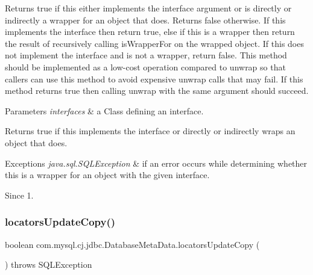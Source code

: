 Returns true if this either implements the interface argument or is directly or indirectly a wrapper for an object that does. Returns false otherwise. If this implements the interface then return true, else if this is a wrapper then return the result of recursively calling {\ttfamily is\+Wrapper\+For} on the wrapped object. If this does not implement the interface and is not a wrapper, return false. This method should be implemented as a low-\/cost operation compared to {\ttfamily unwrap} so that callers can use this method to avoid expensive {\ttfamily unwrap} calls that may fail. If this method returns true then calling {\ttfamily unwrap} with the same argument should succeed.


\begin{DoxyParams}{Parameters}
{\em interfaces} & a Class defining an interface. \\
\hline
\end{DoxyParams}
\begin{DoxyReturn}{Returns}
true if this implements the interface or directly or indirectly wraps an object that does. 
\end{DoxyReturn}

\begin{DoxyExceptions}{Exceptions}
{\em java.\+sql.\+S\+Q\+L\+Exception} & if an error occurs while determining whether this is a wrapper for an object with the given interface. \\
\hline
\end{DoxyExceptions}
\begin{DoxySince}{Since}
1. 
\end{DoxySince}
\mbox{\label{classcom_1_1mysql_1_1cj_1_1jdbc_1_1_database_meta_data_ac78da02bca393ec069012d58109f562f}} 
\subsubsection{\texorpdfstring{locators\+Update\+Copy()}{locatorsUpdateCopy()}}
{\footnotesize\ttfamily boolean com.\+mysql.\+cj.\+jdbc.\+Database\+Meta\+Data.\+locators\+Update\+Copy (\begin{DoxyParamCaption}{ }\end{DoxyParamCaption}) throws S\+Q\+L\+Exception}

